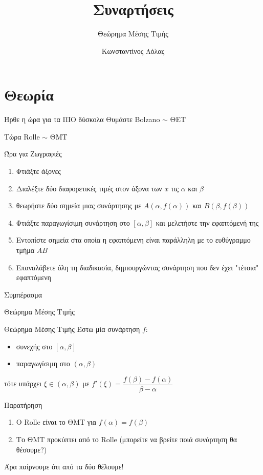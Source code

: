 \documentclass{presentation}
\title{Συναρτήσεις}
\subtitle{Θεώρημα Μέσης Τιμής}
\author[Λόλας]{Κωνσταντίνος Λόλας}
\begin{document}
\begin{frame}
  \titlepage
\end{frame}

\section{Θεωρία}
\begin{frame}{Ήρθε η ώρα για τα ΠΙΟ δύσκολα}
  Θυμάστε Bolzano $\sim$ ΘΕΤ

  Τώρα Rolle $\sim$ ΘΜΤ
\end{frame}

\begin{frame}{Ώρα για Ζωγραφιές}
  \begin{enumerate}[<+->]
    \item Φτιάξτε άξονες
    \item Διαλέξτε δύο διαφορετικές τιμές στον άξονα των $x$ τις $α$ και $β$
    \item θεωρήστε δύο σημεία μιας συνάρτησης με $Α(α,f(α))$ και $Β(β,f(β))$
    \item Φτιάξτε παραγωγίσιμη συνάρτηση στο $[α,β]$ και μελετήστε την εφαπτόμενή της
    \item Εντοπίστε σημεία στα οποία η εφαπτόμενη είναι παράλληλη με το ευθύγραμμο τμήμα $ΑΒ$
    \item Επαναλάβετε όλη τη διαδικασία, δημιουργώντας συνάρτηση που δεν έχει "τέτοια" εφαπτόμενη
  \end{enumerate}
   Συμπέρασμα

\end{frame}

\begin{frame}{Θεώρημα Μέσης Τιμής}
  \begin{block}{Θεώρημα Μέσης Τιμής}
    Έστω μία συνάρτηση $f$:
    \begin{itemize}
      \item συνεχής στο $[α,β]$
      \item παραγωγίσιμη στο $(α,β)$
    \end{itemize}
    τότε υπάρχει $ξ\in (α,β)$ με $f'(ξ)=\dfrac{f(β)-f(α)}{β-α}$
  \end{block}
\end{frame}

\begin{frame}{Παρατήρηση}
  \begin{enumerate}[<+->]
    \item Ο Rolle είναι το ΘΜΤ για $f(α)=f(β)$
    \item Το ΘΜΤ προκύπτει από το Rolle (μπορείτε να βρείτε ποιά συνάρτηση θα θέσουμε?)
  \end{enumerate}
   Άρα παίρνουμε ότι από τα δύο θέλουμε!
\end{frame}
\end{document}
